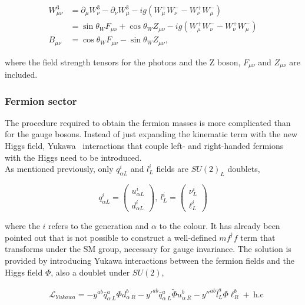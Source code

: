 \begin{equation}
\begin{split}
    W_{\mu\nu}^3 &= \partial_\mu W_\nu^3 - \partial_\nu W_\mu^3 - ig(W_\mu^+W_\nu^- - W_\nu^+ W_\mu^-)\\
    &= \sin\theta_W F_{\mu\nu} + \cos\theta_W Z_{\mu\nu} - ig(W_\mu^+W_\nu^- - W_\nu^+ W_\mu^-)\\
    B_{\mu\nu} &= \cos\theta_W F_{\mu\nu} - \sin\theta_W Z_{\mu\nu},
\end{split}
\end{equation}

where the field strength tensors for the photons and the Z boson, $F_{\mu\nu}$ and $Z_{\mu\nu}$ are included.

\subsubsection{Fermion sector}%

The procedure required to obtain the fermion masses is more complicated than for the gauge bosons. Instead of just expanding the kinematic term with the new Higgs field, Yukawa~\cite{yukawa} interactions that couple left- and right-handed fermions with the Higgs need to be introduced.\\

As mentioned previously, only $q_{\alpha L}^i$ and $l^i_L$ fields are $SU(2)_L$ doublets,

\begin{equation}
    \label{Theory_eq:SUdoublets}
    q_{\alpha L}^i=\begin{pmatrix} u^i_{\alpha L} \\ d^i_{\alpha L} \end{pmatrix},\ l_L^i = \begin{pmatrix} \nu^i_L \\ \ell^i_L \end{pmatrix}
\end{equation}

where the $i$ refers to the generation and $\alpha$ to the colour. It has already been pointed out that is not possible to construct a well-defined $mf^\dag f$ term that transforms under the SM group, necessary for gauge invariance. The solution is provided by introducing Yukawa interactions between the fermion fields and the Higgs field $\Phi$, also a doublet under $SU(2)$,

\begin{equation}
\begin{split}
    &\mathcal{L}_{Yukawa} = -y^{ab}\bar{q}^a_{\alpha\ L}\Phi d^b_{\alpha\ R} - y'^{ab}\bar{q}^a_{\alpha\ L}\tilde{\Phi} u^b_{\alpha\ R}-y''^{ab}\bar{l}^a_{L}\Phi \ell^b_{R}+\ \text{h.c}\\
\end{split}
\end{equation}

